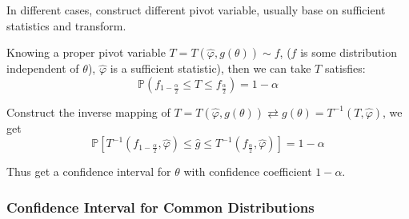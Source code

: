     In different cases, construct different pivot variable, usually base on sufficient statistics and transform.
    
    Knowing a proper pivot variable $T=T(\hat{\varphi},g(\theta))\sim f$, ($f$ is some distribution independent of $\theta$), $\hat{\varphi}$ is a sufficient statistic), then we can take $T$ satisfies:
    \begin{equation}
        \mathbb{P}(f_{1-\frac{\alpha}{2}}\leq T\leq f_{\frac{\alpha}{2}})=1-\alpha
    \end{equation}

    Construct the inverse mapping of $T=T(\hat{\varphi},g(\theta))\rightleftarrows g(\theta)=T^{-1}(T,\hat{\varphi})$, we get
    \begin{equation}
        \mathbb{P}[T^{-1}(f_{1-\frac{\alpha}{2}},\hat{\varphi})\leq\hat{g}\leq T^{-1}(f_{\frac{\alpha}{2}},\hat{\varphi})]=1-\alpha
    \end{equation}
    
    Thus get a confidence interval for $\theta$ with confidence coefficient $1-\alpha$.\\


\newpage
\subsubsection{Confidence Interval for Common Distributions}\label{SubSectionConfidenceIntervalForDistributions}


